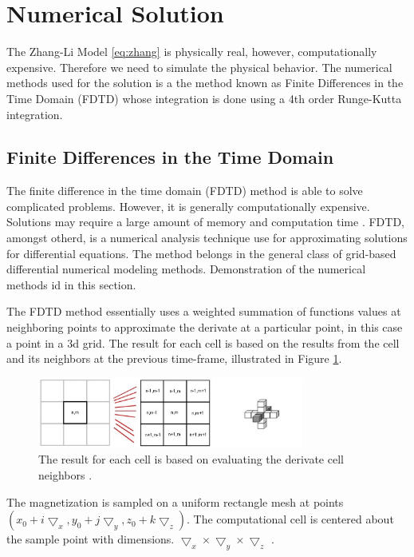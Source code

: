\section{Numerical Solution}

The Zhang-Li Model \ref{eq:zhang} is physically real, however, computationally expensive. Therefore we need to simulate the physical behavior. The numerical methods used for the solution is a the method known as Finite Differences in the Time Domain (FDTD) whose integration is done using a 4th order Runge-Kutta integration.

\subsection{Finite Differences in the Time Domain}

The finite difference in the time domain (FDTD) method  is able to solve complicated problems. However, it is generally computationally expensive. Solutions may require a large amount of memory and computation time \cite{ufdtd}. FDTD, amongst otherd, is a numerical analysis technique use for approximating solutions for differential equations. The method belongs in the general class of grid-based differential numerical modeling methods. Demonstration of the numerical methods id in this section\cite{methods}.

The FDTD method essentially uses a weighted summation of functions values at neighboring points to approximate the derivate at a particular point, in this case a point in a 3d grid. The result for each cell is based on the results from the cell and its neighbors at the previous time-frame, illustrated in Figure \ref{fig:fdtd}.  

\begin{figure}[htbp]
	\centering
		\includegraphics[width=0.78\textwidth]{Figures/fdtd.png}
		\smallskip
	\caption[FDTD grid]{The result for each cell is based on evaluating the derivate cell neighbors \cite{methods}.}
	\label{fig:fdtd}
\end{figure}

The magnetization is sampled on a uniform rectangle mesh at points $(x_0 + i\bigtriangledown_x, y_0 + j\bigtriangledown_y, z_0 + k\bigtriangledown_z)$. The computational cell is centered about the sample point with dimensions. $\bigtriangledown_x \times \bigtriangledown_y \times \bigtriangledown_z$ \cite{methods}.

